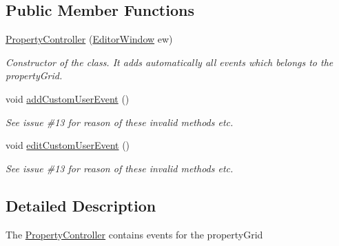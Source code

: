 \subsection*{Public Member Functions}
\begin{DoxyCompactItemize}
\item 
\hyperlink{class_controller_1_1_editor_controller_1_1_property_controller_a85eb7c78dfc37eeecc10d2245ccc88f4}{Property\-Controller} (\hyperlink{class_a_rdev_kit_1_1_editor_window}{Editor\-Window} ew)
\begin{DoxyCompactList}\small\item\em Constructor of the class. It adds automatically all events which belongs to the property\-Grid. \end{DoxyCompactList}\item 
void \hyperlink{class_controller_1_1_editor_controller_1_1_property_controller_a92aa673be6328b973f2d93b0b75fc132}{add\-Custom\-User\-Event} ()
\begin{DoxyCompactList}\small\item\em See issue \#13 for reason of these invalid methods etc. \end{DoxyCompactList}\item 
void \hyperlink{class_controller_1_1_editor_controller_1_1_property_controller_a1f2413f63177c68c138b4553526b9901}{edit\-Custom\-User\-Event} ()
\begin{DoxyCompactList}\small\item\em See issue \#13 for reason of these invalid methods etc. \end{DoxyCompactList}\end{DoxyCompactItemize}


\subsection{Detailed Description}
The \hyperlink{class_controller_1_1_editor_controller_1_1_property_controller}{Property\-Controller} contains events for the property\-Grid 



